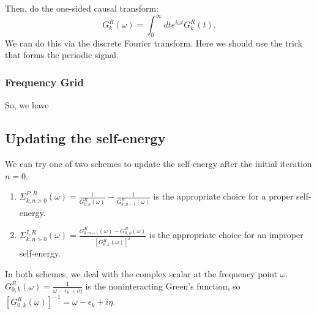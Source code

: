 Then, do the one-sided causal transform:
\begin{equation}
    G^R_{k}(\omega) = \int_0^{\infty} dt e^{i\omega t} G^R_{k}(t).
\end{equation}
We can do this via the discrete Fourier transform. Here we should use the trick that forms the periodic signal. 
\subsubsection{Frequency Grid}
So, we have 
\subsection{Updating the self-energy }
We can try one of two schemes to update the self-energy after the initial iteration $n=0$.
\begin{enumerate}
    \item $\Sigma_{k, n>0}^{P,R}(\omega) = \frac{1}{G^{R}_{0,k}(\omega)} - \frac{1}{G^R_{k,n-1}(\omega)}$ is the appropriate choice for a proper self-energy.
    \item $\Sigma_{k, n>0}^{I,R}(\omega) = \frac{G_{k,n-1}^R(\omega)-G_{ 0,k}^{R}(\omega)}{\left[G_{0,k}^{R}(\omega)\right]^2}$ is the appropriate choice for an improper self-energy.
\end{enumerate}
In both schemes, we deal with the complex scalar at the frequency point $\omega$. $G_{0,k}^R(\omega) = \frac{1}{\omega - \epsilon_k + i\eta}$ is the noninteracting Green's function, so $\left[G_{0,k}^R(\omega)\right]^{-1} = \omega - \epsilon_k + i\eta$.
